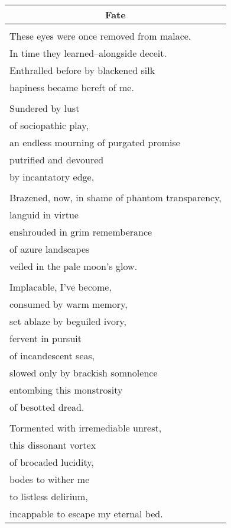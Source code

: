 \documentclass{article}
\begin{document}
\begin{center}
\begin{tabular}{l}
\multicolumn{1}{c}{\textbf{Fate}} \\ \hline
\\
These eyes were once removed from malace. \\
In time they learned--alongside deceit. \\
Enthralled before by blackened silk \\
hapiness became bereft of me. \\
\\
Sundered by lust \\
of sociopathic play, \\
an endless mourning of purgated promise \\
putrified and devoured \\
by incantatory edge, \\
\\
Brazened, now, in shame of phantom transparency, \\
languid in virtue \\
enshrouded in grim rememberance \\
of azure landscapes \\
veiled in the pale moon's glow. \\
\\
Implacable, I've become, \\
consumed by warm memory, \\
set ablaze by beguiled ivory, \\
fervent in pursuit \\
of incandescent seas, \\
slowed only by brackish somnolence \\
entombing this monstrosity \\
of besotted dread. \\
\\
Tormented with irremediable unrest, \\
this dissonant vortex \\
of brocaded lucidity, \\
bodes to wither me \\
to listless delirium, \\
incappable to escape my eternal bed. \\
\end{tabular}
\end{center}
\end{document}
